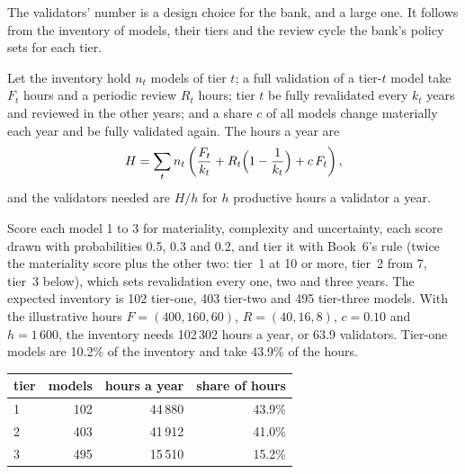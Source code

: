 The validators' number is a design choice for the bank, and a large one. It follows from the inventory of models, their
tiers and the review cycle the bank's policy sets for each tier.

\begin{method}\label{met:in:bank-quant:workload}
Let the inventory hold $n_t$ models of tier $t$; a full validation of a tier-$t$ model take $F_t$ hours and a periodic
review $R_t$ hours; tier $t$ be fully revalidated every $k_t$ years and reviewed in the other years; and a share $c$ of all
models change materially each year and be fully validated again. The hours a year are
\[
H=\sum_t n_t\left(\frac{F_t}{k_t}+R_t\Bigl(1-\frac{1}{k_t}\Bigr)+c\,F_t\right),
\]
and the validators needed are $H/h$ for $h$ productive hours a validator a year.
\end{method}

\begin{example}\label{ex:in:bank-quant:inventory}
Score each model 1 to 3 for materiality, complexity and uncertainty, each score drawn with probabilities 0.5, 0.3 and
0.2, and tier it with Book~6's rule (twice the materiality score plus the other two: tier~1 at 10 or more, tier~2 from 7, tier~3 below), which sets
revalidation every one, two and three years. The expected inventory is 102 tier-one, 403 tier-two and 495 tier-three
models. With the illustrative hours $F=(400,160,60)$, $R=(40,16,8)$, $c=0.10$ and $h=1\,600$, the inventory needs
102\,302 hours a year, or 63.9 validators. Tier-one models are 10.2\% of the inventory and take 43.9\% of the hours.
\end{example}

\begin{center}\footnotesize
\begin{tabular}{@{}lrrr@{}}
\toprule
tier & models & hours a year & share of hours\\
\midrule
1 & 102 & 44\,880 & 43.9\%\\
2 & 403 & 41\,912 & 41.0\%\\
3 & 495 & 15\,510 & 15.2\%\\
\bottomrule
\end{tabular}
\end{center}

